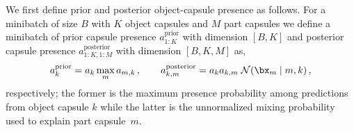 We first define prior and posterior object-capsule presence as follows.
For a minibatch of size {\small$B$} with {\small$K$} object capsules and $M$ part capsules we define a minibatch of prior capsule presence $a^\mathrm{prior}_{1:K}$ with dimension {\small$[B, K]$} and posterior capsule presence $a^\mathrm{posterior}_{1:K,1:M}$ with dimension {\small$[B, K, M]$} as,
\vspace*{-.2em}
\begin{equation}
    a^\mathrm{prior}_k = a_k \max_m a_{m,k}\,,
    \qquad
    a^\mathrm{posterior}_{k,m} = a_k a_{k,m}\;\gauss{\bx_m \mid m,k}\,,
\end{equation}
respectively; the former is the maximum presence probability among predictions from object capsule $k$ while the latter is the unnormalized mixing probability used to explain part capsule~$m$.
\vspace*{-.5em}
